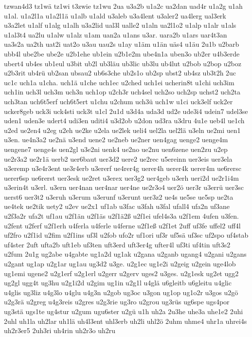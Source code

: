 {tzwan4d3
tz1wä
tz1wi
t3zwie
tz1wu
2ua
u3a2b
u1a2c
ua2dan
uad4r
u1a2g
u1ah
u1al.
u1a2l1a
u1a2l1ä
u1alb
u1ald
u3aleb
u3a4lent
u3aler2
ua4lerg
ual3erk
u3a2let
u1alf
u1alg
u1alh
u3a2lid
ual3l
ualle2
u1aln
ua2l1o2
u1alp
u1alr
u1als
u1al3t4
ua2lu
u1alw
u1alz
u1am
uan2a
u1ans
u3ar.
uara2b
u1ars
uar4t3an
ua3s2a
ua2th
uat2i
uat2o
u3au
uau2s
u1ay
u1äm
u1än
uäs4
u1äu
2u1b
u2barb
ubb4l
ube2be
ube2e
u2b1ehe
ub1ein
u2b1e2m
ube4n1a
uben3o
ub2er
u4b3erde
ubert4
ub4es
ub1eul
u3bit
ub2l
ub3läu
ub3lic
ub3lu
ub4lut
u2bob
u2bop
u2boz
u2b3rit
ub4rü
ub2san
ubsau2
ub6s3che
ub2s1o
ub2sp
ubst2
ub4sz
ub3t2h
2uc
uc1c
uch1a
u1cha.
uch1ä
u1che
uch1ec
u2ched
uch1ei
ucherin8t
u1chi
uch3im
uch1in
uch3l
uch3m
uch3n
uch1op
u2ch3r
uch4sel
uch2so
uch2sp
uchst2
uch2ta
uch3tan
uch6t5erf
uch6t5ert
u1chu
u2chum
uch3ü
uch1w
u1ci
uck3elf
uck2er
ucker8geb
uck3i
uck4sti
uck3t
u1cl
2u1d
u3d4a
uda3d
ud2e
ude3i4
udein7
udel3se
uden1
uden3e
udert4
udi3en
uditi4
u3d2ob
u2don
ud3ra
u3dru
4u1e
ueb4l
ue1ch
u2ed
ue2en4
u2eg
u2eh
ue2ke
u2ela
ue2lek
ueli4
uel2la
uel2lä
u3eln
ue2mi
uen1
u3en.
ue4n3a2
ue2nä
u3end
uene2
ue2neb
ue2ner
uen4gag
uenge2
uenge4m
uengene7
uenge4s
uen2gl
u3e2ni
uenk4
ue2no
ue2nu
uen6zene
uen2zu
u2ep
ue2r3a2
ue2r1ä
uerb2
uer6baut
uer3d2
uere2
ue2rec
u5ereinn
uer3eis
uer3ela
u3eremp
u3e4r3ent
ue3r4erb
u3ererf
ue4rer4g
uerer4h
uerer4k
uerer4m
ue6rersc
uerer6sp
ue6rerst
uer3esk
ue2ret
u3erex
uer3g2
uer4geb
u3erh
ueri2d
ue2r1i4m
u3erin4t
u3erl.
u3ern
uer4nan
uer4nar
uer4ne
ue2r3o4
uer2ö
uer3r
u3errü
uer3sc
uerst6
uer3t2
u3eruh
u3erum
u3erunf
u3erunt
uer3z2
ue4s
ue5se
ue5sp
ue2ta
ue4tek
ue2tik
uety2
u2ev
ue2x1
uf1ab
u3fac
u3fah
u3fal
ufall4
ufa2n
uf3ane
u2f3a2r
ufa2t
uf1au
u2f1än
u2f1äs
u2f1ä2ß
u2f1ei
ufel4s3a
u2f1em
4ufen
u3fen.
u2fent
u2ferf
u2f1erh
u4ferla
u4ferle
u4ferne
u2f1eß
u2f1et
2uff
uf3fe
uffel2
uff4l
uf2fro
u2f1id
u2fim
u2f1ins
uf3l
u2fob
ufo2r
uf1ori
uf3r
uf5sä
uf3sc
uf2spo
uf4stab
uf4ster
2uft
ufta2b
uft1eb
uf3ten
uft3erd
uft3er4g
ufter4l
uf3ti
uf4tin
uft3s2
u2fum
2u1g
ug2abe
u4gabte
ug1a2d
ug1ak
u2gana
u2ganb
ugang4
u2gani
u2gans
u2gant
ug1ap
u2g1ar
ug1au
ug3d2
u3ge.
u2g1ec
ug1e2i
u2geig
u2gein
uge4lob
ug1emi
ugene2
u2g1erf
u2g1erl
u2gerr
u2gerv
uges2
u3ges.
u2g1esk
ug2et
ugg2
ug2gl
ugg4t
ug3hu
u2g1i2d
u2gim
ug1in
u2g1l
u4glä
u6gleitb
u6gleitu
u4glic
u4glis
ug3liz
u4g3lo
u4glu
u4g3n
u2gob
ug3oc
u3gon
ug1op
ug1o2r
u3gos
u2gö
u2g3rä
u2greg
u4g3reis
u2gres
u2g3rie
ug3ro
u2grou
ug3rüs
ug6spe
ugs4por
ug3stä
ugs1te
ug4stur
u2gum
ugu6ster
u2gü
u1h
uh2a
2u3he
uhe3a
uhe1e2
2uhi
2uhl
uh1la
uh2lar
uh1lä
uh4l3ent
uhl3erb
uh2li
uhl2ö
2uhm
uhme4
uhr1a
uhrei4s
uh2r3er5
2uh3ri
uh4rin
uh2r3o
uh2ru
}
